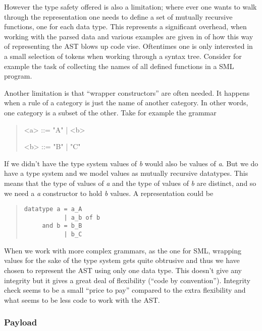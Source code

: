 However the type safety offered is also a limitation; where ever one wants to
walk through the representation one needs to define a set of mutually recursive
functions, one for each data type. This represents a significant overhead, when
working with the parsed data and various examples are given in \cite{mbp08} of
how this way of representing the AST blows up code vise. Oftentimes one is only
interested in a small selection of tokens when working through a syntax
tree. Consider for example the task of collecting the names of all defined
functions in a SML program.


Another limitation is that ``wrapper constructors'' are often needed. It happens
when a rule of a category is just the name of another category. In other words,
one category is a subset of the other. Take for example the grammar

\setlength{\grammarindent}{3.5em} 
\begin{quote}
  \begin{grammar}
    <a> ::= "A" | <b>

    <b> ::= "B" | "C"
  \end{grammar}
\end{quote}


If we didn't have the type system values of \textit{b} would also be values of
\textit{a}. But we do have a type system and we model values as mutually
recursive datatypes. This means that the type of values of \textit{a} and the
type of values of \textit{b} are distinct, and so we need a \textit{a}
constructor to hold \textit{b} values. A representation could be

\begin{quote}
\begin{verbatim}
datatype a = a_A
           | a_b of b
     and b = b_B
           | b_C
\end{verbatim}
\end{quote}

When we work with more complex grammars, as the one for SML, wrapping values for
the sake of the type system gets quite obtrusive and thus we have chosen to
represent the AST using only one data type. This doesn't give any integrity but
it gives a great deal of flexibility (``code by convention''). Integrity check
seems to be a small ``price to pay'' compared to the extra flexibility and what
seems to be less code to work with the AST.

\subsubsection{Payload}


